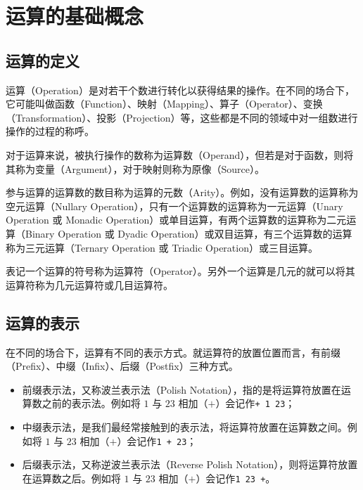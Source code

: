 \section{运算的基础概念}\label{sec:Calculations/OperationBasics}
    \subsection{运算的定义}\label{subsec:Calculations/OperationBasics/DefinitionOfOperation}
        运算（Operation）是对若干个数进行转化以获得结果的操作。在不同的场合下，它可能叫做函数（Function）、映射（Mapping）、算子（Operator）、变换（Transformation）、投影（Projection）等，这些都是不同的领域中对一组数进行操作的过程的称呼。

        对于运算来说，被执行操作的数称为运算数（Operand），但若是对于函数，则将其称为变量（Argument），对于映射则称为原像（Source）。

        参与运算的运算数的数目称为运算的元数（Arity）。例如，没有运算数的运算称为空元运算（Nullary Operation），只有一个运算数的运算称为一元运算（Unary Operation 或 Monadic Operation）或单目运算，有两个运算数的运算称为二元运算（Binary Operation 或 Dyadic Operation）或双目运算，有三个运算数的运算称为三元运算（Ternary Operation 或 Triadic Operation）或三目运算。

        表记一个运算的符号称为运算符（Operator）。另外一个运算是几元的就可以将其运算符称为几元运算符或几目运算符。

    \subsection{运算的表示}\label{subsec:Calculations/OperationBasics/PresentationOfOperation}
        在不同的场合下，运算有不同的表示方式。就运算符的放置位置而言，有前缀（Prefix）、中缀（Infix）、后缀（Postfix）三种方式。

        \begin{itemize}
            \item 前缀表示法，又称波兰表示法（Polish Notation），指的是将运算符放置在运算数之前的表示法。例如将 $1$ 与 $23$ 相加（$+$）会记作\texttt{+ 1 23}；
            \item 中缀表示法，是我们最经常接触到的表示法，将运算符放置在运算数之间。例如将 $1$ 与 $23$ 相加（$+$）会记作\texttt{1 + 23}；
            \item 后缀表示法，又称逆波兰表示法（Reverse Polish Notation），则将运算符放置在运算数之后。例如将 $1$ 与 $23$ 相加（$+$）会记作\texttt{1 23 +}。
        \end{itemize}

